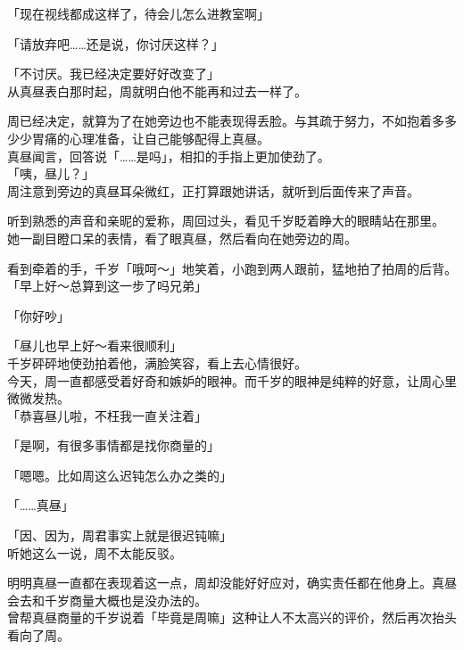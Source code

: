 「现在视线都成这样了，待会儿怎么进教室啊」

「请放弃吧……还是说，你讨厌这样？」

「不讨厌。我已经决定要好好改变了」\\

从真昼表白那时起，周就明白他不能再和过去一样了。

周已经决定，就算为了在她旁边也不能表现得丢脸。与其疏于努力，不如抱着多多少少胃痛的心理准备，让自己能够配得上真昼。\\

真昼闻言，回答说「……是吗」，相扣的手指上更加使劲了。\\

「咦，昼儿？」\\

周注意到旁边的真昼耳朵微红，正打算跟她讲话，就听到后面传来了声音。

听到熟悉的声音和亲昵的爱称，周回过头，看见千岁眨着睁大的眼睛站在那里。\\

她一副目瞪口呆的表情，看了眼真昼，然后看向在她旁边的周。

看到牵着的手，千岁「哦呵～」地笑着，小跑到两人跟前，猛地拍了拍周的后背。\\

「早上好～总算到这一步了吗兄弟」

「你好吵」

「昼儿也早上好～看来很顺利」\\

千岁砰砰地使劲拍着他，满脸笑容，看上去心情很好。\\

今天，周一直都感受着好奇和嫉妒的眼神。而千岁的眼神是纯粹的好意，让周心里微微发热。\\

「恭喜昼儿啦，不枉我一直关注着」

「是啊，有很多事情都是找你商量的」

「嗯嗯。比如周这么迟钝怎么办之类的」

「……真昼」

「因、因为，周君事实上就是很迟钝嘛」\\

听她这么一说，周不太能反驳。

明明真昼一直都在表现着这一点，周却没能好好应对，确实责任都在他身上。真昼会去和千岁商量大概也是没办法的。\\

曾帮真昼商量的千岁说着「毕竟是周嘛」这种让人不太高兴的评价，然后再次抬头看向了周。\\

